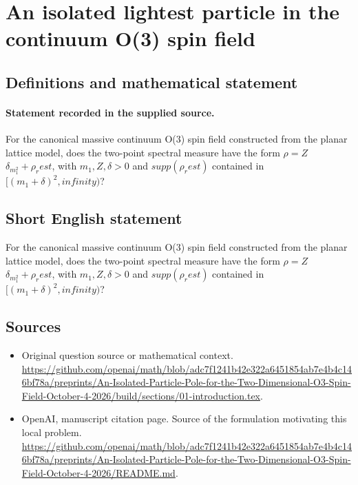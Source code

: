 \documentclass[11pt]{article}
\begin{document}
\section*{An isolated lightest particle in the continuum O(3) spin field}\label{statement}
\subsection{Definitions and mathematical statement}
\paragraph{Statement recorded in the supplied source.}
For the canonical massive continuum O(3) spin field constructed from the planar lattice model, does the two-point spectral measure have the form $\rho =Z$ $\delta _{m_1^2}+\rho _rest$, with $m_1,Z,\delta >0$ and $supp(\rho _rest)$ contained in $[(m_1+\delta )^2,infinity)$?
\subsection{Short English statement}
For the canonical massive continuum O(3) spin field constructed from the planar lattice model, does the two-point spectral measure have the form $\rho =Z$ $\delta _{m_1^2}+\rho _rest$, with $m_1,Z,\delta >0$ and $supp(\rho _rest)$ contained in $[(m_1+\delta )^2,infinity)$?
\subsection{Sources}
\begin{itemize}
\item[S1] Original question source or mathematical context.
\url{https://github.com/openai/math/blob/adc7f1241b42e322a6451854ab7e4b4c146bf78a/preprints/An-Isolated-Particle-Pole-for-the-Two-Dimensional-O3-Spin-Field-October-4-2026/build/sections/01-introduction.tex}.
\item[S2] OpenAI, manuscript citation page. Source of the formulation motivating this local problem.
\url{https://github.com/openai/math/blob/adc7f1241b42e322a6451854ab7e4b4c146bf78a/preprints/An-Isolated-Particle-Pole-for-the-Two-Dimensional-O3-Spin-Field-October-4-2026/README.md}.
\end{itemize}
\end{document}
